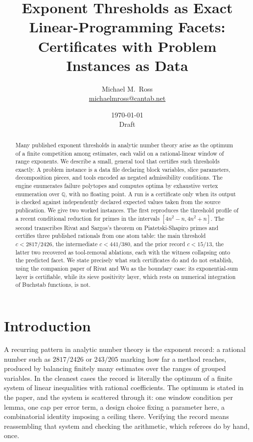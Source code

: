 \documentclass[11pt]{article}
\title{Exponent Thresholds as Exact Linear-Programming Facets:\\
Certificates with Problem Instances as Data}
\author{Michael M.\ Ross\\
\small\href{mailto:michaelmross@cantab.net}{michaelmross@cantab.net}}
\date{\today\\[2pt]\small Draft}
\newcommand{\Q}{\mathbb{Q}}
\begin{document}
\maketitle

\begin{abstract}
Many published exponent thresholds in analytic number theory arise as the
optimum of a finite competition among estimates, each valid on a
rational-linear window of range exponents. We describe a small, general
tool that certifies such thresholds exactly. A problem instance is a data
file declaring block variables, slice parameters, decomposition pieces,
and tools encoded as negated admissibility conditions. The engine
enumerates failure polytopes and computes optima by exhaustive vertex
enumeration over $\Q$, with no floating point. A run is a certificate
only when its output is checked against independently declared expected
values taken from the source publication. We give two worked instances.
The first reproduces the threshold profile of a recent conditional
reduction for primes in the intervals $[4n^2-n,4n^2+n]$. The second
transcribes Rivat and Sargos's theorem on Piatetski-Shapiro primes and
certifies three published rationals from one atom table: the main
threshold $c<2817/2426$, the intermediate $c<441/380$, and the prior
record $c<15/13$, the latter two recovered as tool-removal ablations,
each with the witness collapsing onto the predicted facet. We state
precisely what such certificates do and do not establish, using the
companion paper of Rivat and Wu as the boundary case: its
exponential-sum layer is certifiable, while its sieve positivity layer,
which rests on numerical integration of Buchstab functions, is not.
\end{abstract}

\section{Introduction}

A recurring pattern in analytic number theory is the exponent record: a
rational number such as $2817/2426$ or $243/205$ marking how far a
method reaches, produced by balancing finitely many estimates over the
ranges of grouped variables. In the cleanest cases the record is
literally the optimum of a finite system of linear inequalities with
rational coefficients. The optimum is stated in the paper, and the
system is scattered through it: one window condition per lemma, one cap
per error term, a design choice fixing a parameter here, a combinatorial
identity imposing a ceiling there. Verifying the record means
reassembling that system and checking the arithmetic, which referees do
by hand, once.
\end{document}
